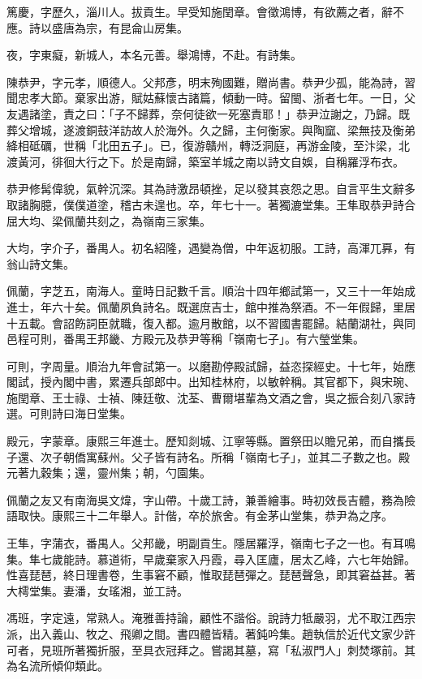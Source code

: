 \begin{pinyinscope}
篤慶，字歷久，淄川人。拔貢生。早受知施閏章。會徵鴻博，有欲薦之者，辭不應。詩以盛唐為宗，有昆侖山房集。

夜，字東癡，新城人，本名元善。舉鴻博，不赴。有詩集。

陳恭尹，字元孝，順德人。父邦彥，明末殉國難，贈尚書。恭尹少孤，能為詩，習聞忠孝大節。棄家出游，賦姑蘇懷古諸篇，傾動一時。留閩、浙者七年。一日，父友遇諸塗，責之曰：「子不歸葬，奈何徒欲一死塞責耶！」恭尹泣謝之，乃歸。既葬父增城，遂渡銅鼓洋訪故人於海外。久之歸，主何衡家。與陶窳、梁無技及衡弟絳相砥礪，世稱「北田五子」。已，復游贛州，轉泛洞庭，再游金陵，至汴梁，北渡黃河，徘徊大行之下。於是南歸，築室羊城之南以詩文自娛，自稱羅浮布衣。

恭尹修髯偉貌，氣幹沉深。其為詩激昂頓挫，足以發其哀怨之思。自言平生文辭多取諸胸臆，僕僕道塗，稽古未遑也。卒，年七十一。著獨漉堂集。王隼取恭尹詩合屈大均、梁佩蘭共刻之，為嶺南三家集。

大均，字介子，番禺人。初名紹隆，遇變為僧，中年返初服。工詩，高渾兀奡，有翁山詩文集。

佩蘭，字芝五，南海人。童時日記數千言。順治十四年鄉試第一，又三十一年始成進士，年六十矣。佩蘭夙負詩名。既選庶吉士，館中推為祭酒。不一年假歸，里居十五載。會詔飭詞臣就職，復入都。逾月散館，以不習國書罷歸。結蘭湖社，與同邑程可則，番禺王邦畿、方殿元及恭尹等稱「嶺南七子」。有六瑩堂集。

可則，字周量。順治九年會試第一。以磨勘停殿試歸，益恣探經史。十七年，始應閣試，授內閣中書，累遷兵部郎中。出知桂林府，以敏幹稱。其官都下，與宋琬、施閏章、王士祿、士禎、陳廷敬、沈荃、曹爾堪輩為文酒之會，吳之振合刻八家詩選。可則詩曰海日堂集。

殿元，字蒙章。康熙三年進士。歷知剡城、江寧等縣。置祭田以贍兄弟，而自攜長子還、次子朝僑寓蘇州。父子皆有詩名。所稱「嶺南七子」，並其二子數之也。殿元著九穀集；還，靈州集；朝，勺園集。

佩蘭之友又有南海吳文煒，字山帶。十歲工詩，兼善繪事。時初效長吉體，務為險語取快。康熙三十二年舉人。計偕，卒於旅舍。有金茅山堂集，恭尹為之序。

王隼，字蒲衣，番禺人。父邦畿，明副貢生。隱居羅浮，嶺南七子之一也。有耳鳴集。隼七歲能詩。慕道術，早歲棄家入丹霞，尋入匡廬，居太乙峰，六七年始歸。性喜琵琶，終日理書卷，生事窘不顧，惟取琵琶彈之。琵琶聲急，即其窘益甚。著大樗堂集。妻潘，女瑤湘，並工詩。

馮班，字定遠，常熟人。淹雅善持論，顧性不諧俗。說詩力牴嚴羽，尤不取江西宗派，出入義山、牧之、飛卿之間。書四體皆精。著鈍吟集。趙執信於近代文家少許可者，見班所著獨折服，至具衣冠拜之。嘗謁其墓，寫「私淑門人」刺焚塚前。其為名流所傾仰類此。


\end{pinyinscope}
